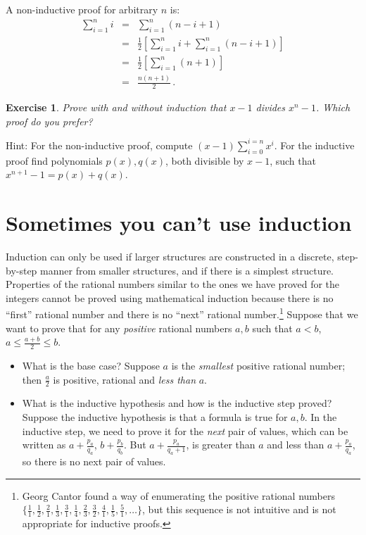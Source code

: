 \documentclass[11pt,a4paper]{report}
\newtheorem{exercise}{Exercise}
\begin{document}
A non-inductive proof for arbitrary $n$ is:
\begin{eqnarray*}
\sum_{i=1}^{n} i &=& \sum_{i=1}^{n} (n-i+1)\\
&=& \frac{1}{2}\left[\sum_{i=1}^{n} i + \sum_{i=1}^{n} (n-i+1)\right]\\
&=& \frac{1}{2}\left[\sum_{i=1}^{n} (n+1)\right]\\
&=& \frac{n(n+1)}{2}\,.
\end{eqnarray*}

\begin{exercise}
Prove with and without induction that $x-1$ divides $x^n-1$. Which proof do you prefer?
\end{exercise}

Hint: For the non-inductive proof, compute $(x-1)\sum_{i=0}^{i=n}x^i$. For the inductive proof find polynomials $p(x),q(x)$, both divisible by $x-1$, such that $x^{n+1} - 1 =p(x)+q(x)$.

\section{Sometimes you can't use induction}

Induction can only be used if larger structures are constructed in a discrete, step-by-step manner from smaller structures, and if there is a simplest structure. Properties of the rational numbers similar to the ones we have proved for the integers cannot be proved using mathematical induction because there is no ``first'' rational number and there is no ``next'' rational number.\footnote{Georg Cantor found a way of enumerating the positive rational numbers $\{\frac{1}{1},\frac{1}{2},\frac{2}{1},\frac{1}{3},\frac{3}{1},\frac{1}{4},\frac{2}{3},\frac{3}{2},\frac{4}{1},\frac{1}{5},\frac{5}{1},\ldots\}$, but this sequence is not intuitive and is not appropriate for inductive proofs.} Suppose that we want to prove that for any \emph{positive} rational numbers $a,b$ such that $a<b$, $a\leq \frac{a+b}{2} \leq b$.

\begin{itemize}
\item What is the base case? Suppose $a$ is the \emph{smallest} positive rational number; then $\frac{a}{2}$ is positive, rational and \emph{less than} $a$.
\item What is the inductive hypothesis and how is the inductive step proved? Suppose the inductive hypothesis is that a formula is true for $a,b$. In the inductive step, we need to prove it for the \emph{next} pair of values, which can be written as $a+\frac{p_a}{q_a}$, $b+\frac{p_b}{q_b}$. But $a+\frac{p_a}{q_a+1}$, is greater than $a$ and less than $a+\frac{p_a}{q_a}$, so there is no next pair of values.
\end{itemize}
\end{document}
